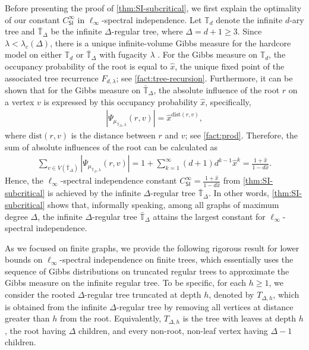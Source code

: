 \documentclass[11pt]{article}
\theoremstyle{plain}
\theoremstyle{definition}
\theoremstyle{remark}
\newcommand{\dist}{\mathrm{dist}}
\newcommand{\SI}{\mathsf{SI}}
\begin{document}
Before presenting the proof of \cref{thm:SI-subcritical}, we first explain the optimality of our constant $C^\infty_\SI$ in $\ell_\infty$-spectral independence.
Let $\mathbb{T}_d$ denote the infinite $d$-ary tree and $\bar{\mathbb{T}}_\Delta$ be the infinite $\Delta$-regular tree, where $\Delta = d+1\ge 3$. Since $\lambda<\lambda_c(\Delta)$, there is a unique infinite-volume Gibbs measure for the hardcore model on either $\mathbb{T}_d$ or $\bar{\mathbb{T}}_\Delta$ with fugacity $\lambda$ \cite{spitzer1975markov,kelly1985stochastic,weitz2006counting}.
For the Gibbs measure on $\mathbb{T}_d$, the occupancy probability of the root is equal to $\hat{x}$, the unique fixed point of the associated tree recurrence $F_{d,\lambda}$; see \cref{fact:tree-recursion}.
Furthermore, it can be shown that for the Gibbs measure on $\bar{\mathbb{T}}_\Delta$, the absolute influence of the root $r$ on a vertex $v$ is expressed by this occupancy probability $\hat{x}$, specifically,
\begin{align*}
	\left|\Psi_{\mu_{\bar{\mathbb{T}}_\Delta,\lambda}}(r,v)\right| = \hat{x}^{\dist(r,v)},
\end{align*}
where $\dist(r,v)$ is the distance between $r$ and $v$; see \cref{fact:prod}.
Therefore, the sum of absolute influences of the root can be calculated as
\begin{align*}
	\sum_{v \in V(\bar{\mathbb{T}}_\Delta)} \left|\Psi_{\mu_{\bar{\mathbb{T}}_\Delta,\lambda}}(r,v)\right|
	= 1 + \sum_{k=1}^\infty (d+1) d^{k-1} \hat{x}^k
	= \frac{1+\hat{x}}{1-d\hat{x}}.
\end{align*}
Hence, the $\ell_\infty$-spectral independence constant $C^\infty_\SI = \frac{1+\hat{x}}{1-d\hat{x}}$ from \cref{thm:SI-subcritical} is achieved by the infinite $\Delta$-regular tree $\bar{\mathbb{T}}_\Delta$.
In other words, \cref{thm:SI-subcritical} shows that, informally speaking, among all graphs of maximum degree $\Delta$, the infinite $\Delta$-regular tree $\bar{\mathbb{T}}_\Delta$ attains the largest constant for $\ell_\infty$-spectral independence.

As we focused on finite graphs, we provide the following rigorous result for lower bounds on $\ell_\infty$-spectral independence on finite trees, which essentially uses the sequence of Gibbs distributions on truncated regular trees to approximate the Gibbs measure on the infinite regular tree.
To be specific, for each $h\geq 1$, we consider the rooted $\Delta$-regular tree truncated at depth $h$, denoted by $T_{\Delta,h}$, which is obtained from the infinite $\Delta$-regular tree by removing all vertices at distance greater than $h$ from the root.
Equivalently, $T_{\Delta,h}$ is the tree with leaves at depth $h$, the root having $\Delta$ children, and every non-root, non-leaf vertex having $\Delta-1$ children.
\end{document}
